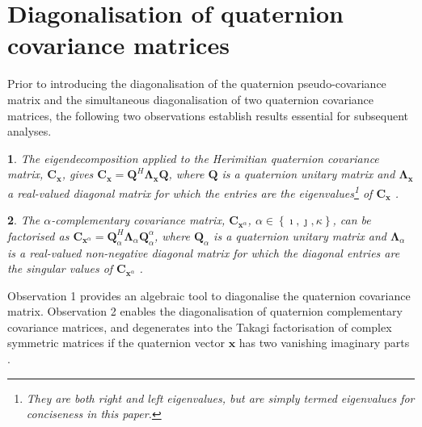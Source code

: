 \documentclass[review]{elsarticle}
\theoremstyle{plain}
\theoremstyle{remark}
\theoremstyle{plain}
\newtheorem{obs}{\protect\observationname}
\theoremstyle{definition}
\theoremstyle{prop}
\theoremstyle{definition}
\theoremstyle{plain}
\theoremstyle{plain}
\providecommand{\observationname}{Observation}
\begin{document}
\section{Diagonalisation of quaternion covariance matrices}
\label{sect: diagonalisation}
Prior to introducing the diagonalisation of the quaternion pseudo-covariance matrix and the simultaneous diagonalisation of two quaternion covariance matrices, the following two observations establish results essential for subsequent analyses. 
\begin{obs}
The eigendecomposition applied to the Herimitian quaternion covariance matrix, $\mathbf{C}_\mathbf{x}$, gives $\mathbf{C}_\mathbf{x}=\mathbf{Q}^{H}\mathbf{\boldsymbol{\Lambda}}_{\mathbf{x}}\mathbf{Q}$, where $\mathbf{Q}$ is a quaternion unitary matrix and $\boldsymbol{\Lambda}_{\mathbf{x}}$ a real-valued diagonal matrix for which the entries are the eigenvalues\footnote{They are both right and left eigenvalues, but are simply termed eigenvalues for conciseness in this paper.} of $\mathbf{C}_\mathbf{x}$ \cite{Rodman2014}.\label{lemma2}
\end{obs}
\begin{obs}
The $\alpha$-complementary covariance matrix, $\mathbf{\mathbf{C}}_{\mathbf{x}^\alpha}$, $\alpha\in\left\{\imath,\jmath,\kappa\right\}$, can be factorised as $\mathbf{\mathbf{C}}_{\mathbf{x}^\alpha}=\mathbf{Q}_{\alpha}^{H}\mathbf{\Lambda}_{\alpha}\mathbf{Q}^{\alpha}_{\alpha}$, where $\mathbf{Q}_{\alpha}$ is a quaternion
unitary matrix and $\mathbf{\mathbf{\boldsymbol{\Lambda}}}_{\alpha}$ is a real-valued non-negative diagonal matrix for which the diagonal entries are the singular values of $\mathbf{C}_{\mathbf{x}^\alpha}$ \cite{CheongTook2011a}.\label{lemma1}
\end{obs}
Observation 1 provides an algebraic tool to diagonalise the quaternion covariance matrix.
Observation 2 enables the diagonalisation of quaternion complementary covariance matrices, and degenerates into the Takagi factorisation of complex symmetric matrices if the quaternion vector $\mathbf{x}$ has two vanishing imaginary parts \cite{Zhang2006}.
\end{document}

